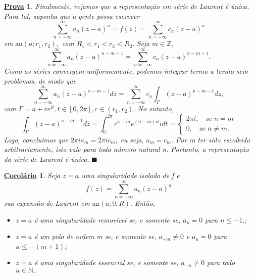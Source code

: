 \documentclass{article}
\newtheorem*{proof*}{\underline{Prova}}
\newtheorem*{crl*}{\underline{Corol\'ario}}
\renewcommand\qedsymbol{$\blacksquare$}
\begin{document}
\begin{proof*}
    Finalmente, vejamos que a representação em série de Laurent é única. Para tal, suponha que a gente possa escrever 
    \[
      \sum\limits_{n=-\infty}^{\infty}a_{n}(z-a)^{n} = f(z) = \sum\limits_{n=-\infty}^{\infty}c_{n}(z-a)^{n}
    \]
    em \(\mathrm{an}(a; r_{1}, r_{2}),\) com \(R_{1} < r_{1} < r_{2} < R_{2}.\) Seja \(m\in \mathbb{Z},\)
    \[
      \sum\limits_{n=-\infty}^{\infty}a_{n}(z-a)^{n-m-1} = \sum\limits_{n=-\infty}^{\infty}c_{n}(z-a)^{n-m-1}.
    \]
    Como as séries convergem uniformemente, podemos integrar termo-a-termo sem problemas, de modo que 
    \[
      \sum\limits_{n=-\infty}^{\infty}a_{n}(z-a)^{n-m-1}dz = \sum\limits_{n=-\infty}^{\infty}c_{n}\int_{\Gamma }^{}(z-a)^{n-m-1}dz,
    \]
    com \(\Gamma = a + r e^{it}, t\in [0, 2\pi ], r\in (r_{1}, r_{2}).\) No entanto, 
    \[
      \int_{\Gamma }^{}(z-a)^{n-m-1}dz = \int_{0}^{2\pi }r^{n-m}e^{(n-m)it}idt  = \left\{\begin{array}{ll}
          2\pi i,\quad \text{se } n =m\\
          0,\quad \text{se } n\neq m.
      \end{array}\right.
    \]
    Logo, concluimos que \(2\pi i a_{m} = 2\pi i c_{m}\), ou seja, \(a_{m}=c_{m}.\) Por m ter sido escolhido arbitrariamente,
    isto vale para todo número natural n. Portanto, a representação da série de Laurent é única. \qedsymbol
  \end{proof*}
  \begin{crl*}
    Seja \(z=a\) uma singularidade isolada de f e 
    \[
      f(z) = \sum\limits_{n=-\infty}^{\infty}a_{n}(z-a)^{n}
    \] 
    sua expansão de Laurent em \(\mathrm{an}(a; 0, R).\) Então,
    \begin{itemize}
      \item[a)] \(z=a\) é uma singularidade removível se, e somente se, \(a_{n} = 0\) para \(n\leq -1.\);
      \item[b)] \(z=a\) é um polo de ordem m se, e somente se, \(a_{-m}\neq0\) e \(a_{n}=0\) para \(n\leq -(m+1)\);
      \item[c)] \(z=a\) é uma singularidade essencial se, e somente se, \(a_{-n}\neq0\) para todo \(n\in \mathbb{N}.\)
    \end{itemize}
  \end{crl*}
\end{document}
